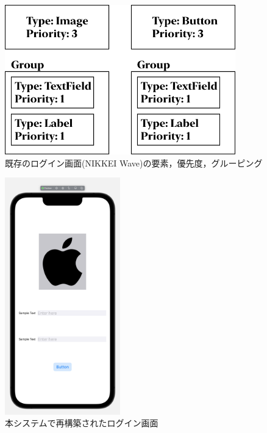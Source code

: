 \begin{figure}[htbp]
  \begin{minipage}{\hsize}
    \begin{center}
       \includegraphics[width=100mm]{img/wave_ViewStructure.png}
    \end{center}
    \caption{既存のログイン画面(NIKKEI Wave)の要素，優先度，グルーピング}
    \label{fig:wave_ViewStructure}
  \end{minipage}
\end{figure}

\begin{figure}[htbp]
  \begin{minipage}{\hsize}
    \begin{center}
       \includegraphics[width=50mm]{img/wave_autogen.png}
    \end{center}
    \caption{本システムで再構築されたログイン画面}
    \label{fig:wave_autogen}
  \end{minipage}
\end{figure}


